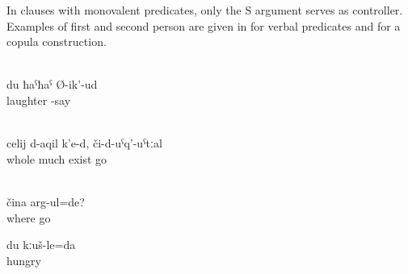 In clauses with monovalent predicates, only the S argument serves as controller. Examples of first and second person are given in  for verbal predicates and  for a copula construction.
%
\begin{exe}
		\\	\label{ex:I (masc.) laugh habitual present}
		\gll	du 	ħaˁħaˁ 		Ø-ik'-ud\\
			 	laughter	-say\\
		\glt	{}

		\\	\label{ex:There is much there, if you go there realis conditional}
		\gll	celij 	d-aqil	k'e-d,	či-d-uˁq'-uˁtːal\\
			whole	much	exist	go\\
		\glt	{}

		\\	\label{ex:Where are you going compound present}
		\gll	čina	arg-ul=de?\\
			where	go\\
		\glt	{}

	\ex	\label{ex:I am hungry agreement rules}
	\gll	du	kːuš-le=da\\
			hungry\\
	\glt	{}
\end{exe}

